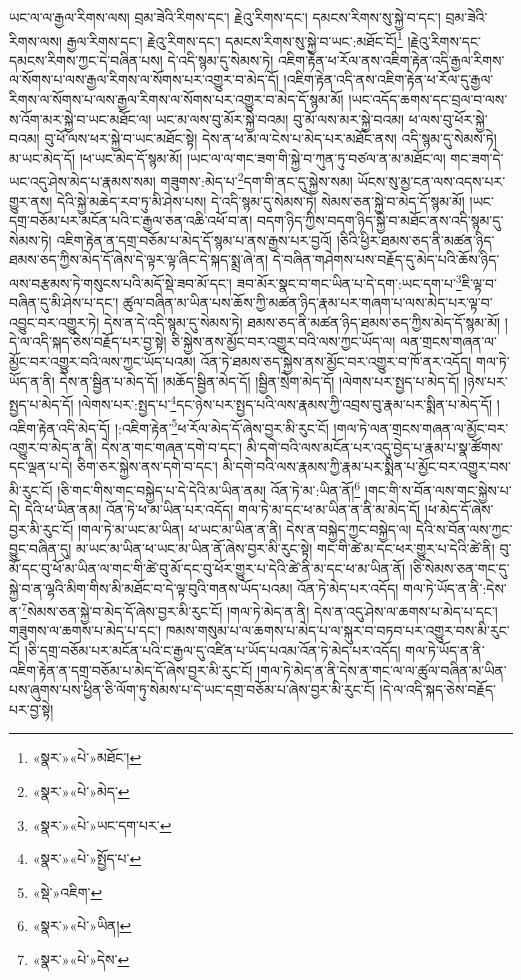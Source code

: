 ཡང་ལ་ལ་རྒྱལ་རིགས་ལས། བྲམ་ཟེའི་རིགས་དང་། རྗེའུ་རིགས་དང་། དམངས་རིགས་སུ་སྐྱེ་བ་དང་། བྲམ་ཟེའི་རིགས་ལས། རྒྱལ་རིགས་དང་། རྗེའུ་རིགས་དང་། དམངས་རིགས་སུ་སྐྱེ་བ་ཡང་:མཐོང་ངོ།\footnote{«སྣར་»«པེ་»མཐོང་།} །རྗེའུ་རིགས་དང་དམངས་རིགས་ཀྱང་དེ་བཞིན་པས། དེ་འདི་སྙམ་དུ་སེམས་ཏེ། འཇིག་རྟེན་ཕ་རོལ་ནས་འཇིག་རྟེན་འདི་རྒྱལ་རིགས་ལ་སོགས་པ་ལས་རྒྱལ་རིགས་ལ་སོགས་པར་འགྱུར་བ་མེད་དོ། །འཇིག་རྟེན་འདི་ནས་འཇིག་རྟེན་ཕ་རོལ་དུ་རྒྱལ་རིགས་ལ་སོགས་པ་ལས་རྒྱལ་རིགས་ལ་སོགས་པར་འགྱུར་བ་མེད་དོ་སྙམ་མོ། །ཡང་འདོད་ཆགས་དང་བྲལ་བ་ལས་ས་འོག་མར་སྐྱེ་བ་ཡང་མཐོང་ལ། ཡང་མ་ལས་བུ་མོར་སྐྱེ་བའམ། བུ་མོ་ལས་མར་སྐྱེ་བའམ། ཕ་ལས་བུ་ཕོར་སྐྱེ་བའམ། བུ་ཕོ་ལས་ཕར་སྐྱེ་བ་ཡང་མཐོང་སྟེ། དེས་ན་ཕ་མ་ལ་ངེས་པ་མེད་པར་མཐོང་ནས། འདི་སྙམ་དུ་སེམས་ཏེ། མ་ཡང་མེད་དོ། །ཕ་ཡང་མེད་དོ་སྙམ་མོ། །ཡང་ལ་ལ་གང་ཟག་གི་སྐྱེ་བ་ཀུན་ཏུ་བཙལ་ན་མ་མཐོང་ལ། གང་ཟག་དེ་ཡང་འདུ་ཤེས་མེད་པ་རྣམས་སམ། གཟུགས་:མེད་པ་\footnote{«སྣར་»«པེ་»མེད་}དག་གི་ནང་དུ་སྐྱེས་སམ། ཡོངས་སུ་མྱ་ངན་ལས་འདས་པར་གྱུར་ནས། དེའི་སྐྱེ་མཆེད་རབ་ཏུ་མི་ཤེས་པས། དེ་འདི་སྙམ་དུ་སེམས་ཏེ། སེམས་ཅན་སྐྱེ་བ་མེད་དོ་སྙམ་མོ། །ཡང་དགྲ་བཅོམ་པར་མངོན་པའི་ང་རྒྱལ་ཅན་འཆི་འཕོ་བ་ན། བདག་ཉིད་ཀྱིས་བདག་ཉིད་སྐྱེ་བ་མཐོང་ནས་འདི་སྙམ་དུ་སེམས་ཏེ། འཇིག་རྟེན་ན་དགྲ་བཅོམ་པ་མེད་དོ་སྙམ་པ་ནས་རྒྱས་པར་བྱའོ། །ཅིའི་ཕྱིར་ཐམས་ཅད་ནི་མཚན་ཉིད་ཐམས་ཅད་ཀྱིས་མེད་དོ་ཞེས་དེ་ལྟར་ལྟ་ཞིང་དེ་སྐད་སྨྲ་ཞེ་ན། དེ་བཞིན་གཤེགས་པས་བརྗོད་དུ་མེད་པའི་ཆོས་ཉིད་ལས་བརྩམས་ཏེ་གསུངས་པའི་མདོ་སྡེ་ཟབ་མོ་དང་། ཟབ་མོར་སྣང་བ་གང་ཡིན་པ་དེ་དག་:ཡང་དག་པ་\footnote{«སྣར་»«པེ་»ཡང་དག་པར་}ཇི་ལྟ་བ་བཞིན་དུ་མི་ཤེས་པ་དང་། ཚུལ་བཞིན་མ་ཡིན་པས་ཆོས་ཀྱི་མཚན་ཉིད་རྣམ་པར་གཞག་པ་ལས་མེད་པར་ལྟ་བ་འབྱུང་བར་འགྱུར་ཏེ། དེས་ན་དེ་འདི་སྙམ་དུ་སེམས་ཏེ། ཐམས་ཅད་ནི་མཚན་ཉིད་ཐམས་ཅད་ཀྱིས་མེད་དོ་སྙམ་མོ། །དེ་ལ་འདི་སྐད་ཅེས་བརྗོད་པར་བྱ་སྟེ། ཅི་སྐྱེས་ནས་མྱོང་བར་འགྱུར་བའི་ལས་ཀྱང་ཡོད་ལ། ལན་གྲངས་གཞན་ལ་མྱོང་བར་འགྱུར་བའི་ལས་ཀྱང་ཡོད་པའམ། འོན་ཏེ་ཐམས་ཅད་སྐྱེས་ནས་མྱོང་བར་འགྱུར་བ་ཁོ་ནར་འདོད། གལ་ཏེ་ཡོད་ན་ནི། དེས་ན་སྦྱིན་པ་མེད་དོ། །མཆོད་སྦྱིན་མེད་དོ། །སྦྱིན་སྲེག་མེད་དོ། །ལེགས་པར་སྤྱད་པ་མེད་དོ། །ཉེས་པར་སྤྱད་པ་མེད་དོ། །ལེགས་པར་:སྤྱད་པ་\footnote{«སྣར་»«པེ་»སྤྱོད་པ་}དང་ཉེས་པར་སྤྱད་པའི་ལས་རྣམས་ཀྱི་འབྲས་བུ་རྣམ་པར་སྨིན་པ་མེད་དོ། །འཇིག་རྟེན་འདི་མེད་དོ། །:འཇིག་རྟེན་\footnote{«སྡེ་»འཇིག་}ཕ་རོལ་མེད་དོ་ཞེས་བྱར་མི་རུང་ངོ། །གལ་ཏེ་ལན་གྲངས་གཞན་ལ་མྱོང་བར་འགྱུར་བ་མེད་ན་ནི། དེས་ན་གང་གཞན་དགེ་བ་དང་། མི་དགེ་བའི་ལས་མངོན་པར་འདུ་བྱེད་པ་རྣམ་པ་སྣ་ཚོགས་དང་ལྡན་པ་དེ། ཅིག་ཅར་སྐྱེས་ནས་དགེ་བ་དང་། མི་དགེ་བའི་ལས་རྣམས་ཀྱི་རྣམ་པར་སྨིན་པ་མྱོང་བར་འགྱུར་བས་མི་རུང་ངོ། །ཅི་གང་གིས་གང་བསྐྱེད་པ་དེ་དེའི་མ་ཡིན་ནམ། འོན་ཏེ་མ་:ཡིན་ནོ།\footnote{«སྣར་»«པེ་»ཡིན།} །གང་གི་ས་བོན་ལས་གང་སྐྱེས་པ་དེ། དེའི་ཕ་ཡིན་ནམ། འོན་ཏེ་ཕ་མ་ཡིན་པར་འདོད། གལ་ཏེ་མ་དང་ཕ་མ་ཡིན་ན་ནི་མ་མེད་དོ། །ཕ་མེད་དོ་ཞེས་བྱར་མི་རུང་ངོ། །གལ་ཏེ་མ་ཡང་མ་ཡིན། ཕ་ཡང་མ་ཡིན་ན་ནི། དེས་ན་བསྐྱེད་ཀྱང་བསྐྱེད་ལ། དེའི་ས་བོན་ལས་ཀྱང་བྱུང་བཞིན་དུ། མ་ཡང་མ་ཡིན་ཕ་ཡང་མ་ཡིན་ནོ་ཞེས་བྱར་མི་རུང་སྟེ། གང་གི་ཚེ་མ་དང་ཕར་གྱུར་པ་དེའི་ཚེ་ནི། བུ་མོ་དང་བུ་ཕོ་མ་ཡིན་ལ་གང་གི་ཚེ་བུ་མོ་དང་བུ་ཕོར་གྱུར་པ་དེའི་ཚེ་ནི་མ་དང་ཕ་མ་ཡིན་ནོ། །ཅི་སེམས་ཅན་གང་དུ་སྐྱེ་བ་ན་ལྷའི་མིག་གིས་མི་མཐོང་བ་དེ་ལྟ་བུའི་གནས་ཡོད་པའམ། འོན་ཏེ་མེད་པར་འདོད། གལ་ཏེ་ཡོད་ན་ནི་:དེས་ན་\footnote{«སྣར་»«པེ་»དེས་}སེམས་ཅན་སྐྱེ་བ་མེད་དོ་ཞེས་བྱར་མི་རུང་ངོ། །གལ་ཏེ་མེད་ན་ནི། དེས་ན་འདུ་ཤེས་ལ་ཆགས་པ་མེད་པ་དང་། གཟུགས་ལ་ཆགས་པ་མེད་པ་དང་། ཁམས་གསུམ་པ་ལ་ཆགས་པ་མེད་པ་ལ་སྐུར་བ་བཏབ་པར་འགྱུར་བས་མི་རུང་ངོ། །ཅི་དགྲ་བཅོམ་པར་མངོན་པའི་ང་རྒྱལ་དུ་འཛིན་པ་ཡོད་པའམ་འོན་ཏེ་མེད་པར་འདོད། གལ་ཏེ་ཡོད་ན་ནི་འཇིག་རྟེན་ན་དགྲ་བཅོམ་པ་མེད་དོ་ཞེས་བྱར་མི་རུང་ངོ། །གལ་ཏེ་མེད་ན་ནི་དེས་ན་གང་ལ་ལ་ཚུལ་བཞིན་མ་ཡིན་པས་ཞུགས་པས་ཕྱིན་ཅི་ལོག་ཏུ་སེམས་པ་དེ་ཡང་དགྲ་བཅོམ་པ་ཞེས་བྱར་མི་རུང་ངོ། །དེ་ལ་འདི་སྐད་ཅེས་བརྗོད་པར་བྱ་སྟེ། 